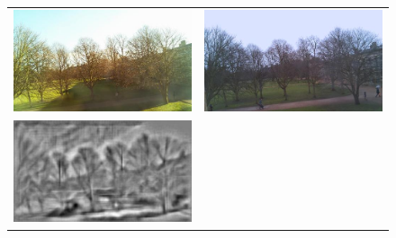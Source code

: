 \documentclass[a4paper,12pt,twoside]{report}
\begin{document}
\begin{figure}[H]
  \centering
    \begin{tabular}{cc}
      \includegraphics[scale=0.4]{./images/conc-hog-orig.jpg} &
      \includegraphics[scale=0.4]{./images/conc-hog-orig-rain.jpg} \\
      \includegraphics[scale=0.4]{./images/conc-machine-hog.jpg}  &

\end{tabular}
\end{figure}
\end{document}
